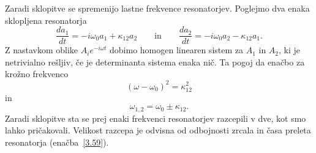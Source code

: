 Zaradi sklopitve se spremenijo lastne frekvence resonatorjev. 
Poglejmo dva enaka sklopljena resonatorja
\begin{equation}
\frac{da_1}{dt}  =  -i\omega_{0}a_{1}+\kappa_{12}a_{2} \qquad \mathrm{in} \qquad 
\frac{da_2}{dt} =  -i\omega_{0}a_{2}-\kappa_{12}a_{1}.
\end{equation}
Z nastavkom oblike $A_{i}e^{-i\omega t}$ dobimo homogen linearen sistem za $A_{1}$ in
$A_{2}$, ki je netrivialno rešljiv, če je determinanta sistema enaka nič.
Ta pogoj da enačbo za krožno frekvenco 
\begin{equation}
(\omega-\omega_{0})^{2}=\kappa_{12}^{2}\label{3.61}
\end{equation}
 in 
\begin{equation}
\omega_{1,2}=\omega_{0}\pm\kappa_{12}.\label{3.62}
\end{equation}
Zaradi sklopitve sta se prej enaki frekvenci resonatorjev razcepili v dve, kot
smo lahko pričakovali. Velikost razcepa je odvisna od odbojnosti zrcala in časa
preleta resonatorja (enačba~\ref{3.59}).

